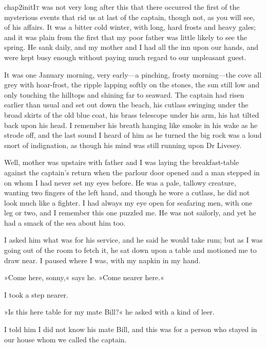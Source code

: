 

 \lettrine[lines=4,image=true]{chap2initI}{t} was not very long after this that there occurred the first of the mysterious events that rid us at last of the captain, though not, as you will see, of his affairs. It was a bitter cold winter, with long, hard frosts and heavy gales; and it was plain from the first that my poor father was little likely to see the spring. He sank daily, and my mother and I had all the inn upon our hands, and were kept busy enough without paying much regard to our unpleasant guest.

It was one January morning, very early—a pinching, frosty morning—the cove all grey with hoar-frost, the ripple lapping softly on the stones, the sun still low and only touching the hilltops and shining far to seaward. The captain had risen earlier than usual and set out down the beach, his cutlass swinging under the broad skirts of the old blue coat, his brass telescope under his arm, his hat tilted back upon his head. I remember his breath hanging like smoke in his wake as he strode off, and the last sound I heard of him as he turned the big rock was a loud snort of indignation, as though his mind was still running upon Dr Livesey.

Well, mother was upstairs with father and I was laying the breakfast-table against the captain's return when the parlour door opened and a man stepped in on whom I had never set my eyes before. He was a pale, tallowy creature, wanting two fingers of the left hand, and though he wore a cutlass, he did not look much like a fighter. I had always my eye open for seafaring men, with one leg or two, and I remember this one puzzled me. He was not sailorly, and yet he had a smack of the sea about him too.

I asked him what was for his service, and he said he would take rum; but as I was going out of the room to fetch it, he sat down upon a table and motioned me to draw near. I paused where I was, with my napkin in my hand.

»Come here, sonny,« says he. »Come nearer here.«

I took a step nearer.

»Is this here table for my mate Bill?« he asked with a kind of leer.

I told him I did not know his mate Bill, and this was for a person who stayed in our house whom we called the captain.

